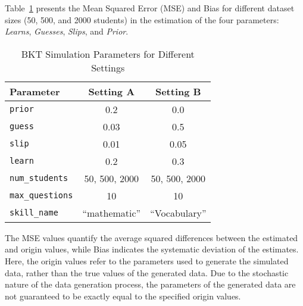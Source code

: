 \documentclass{article}
\begin{document}
Table~\ref{tab:sim_params_3} presents the Mean Squared Error (MSE) and Bias for different dataset sizes (50, 500, and 2000 students) in the estimation of the four parameters: \textit{Learns}, \textit{Guesses}, \textit{Slips}, and \textit{Prior}.

\begin{table}[H]
\centering
\caption{BKT Simulation Parameters for Different Settings}
\label{tab:sim_params_3}
\begin{tabular}{@{}lcc@{}}
\toprule
\textbf{Parameter} & \textbf{Setting A} & \textbf{Setting B} \\ 
\midrule
\texttt{prior} & 0.2 & 0.0 \\ 
\texttt{guess} & 0.03 & 0.5 \\ 
\texttt{slip} & 0.01 & 0.05 \\ 
\texttt{learn} & 0.2 & 0.3 \\ 
\texttt{num\_students} & 50, 500, 2000 & 50, 500, 2000 \\ 
\texttt{max\_questions} & 10 & 10 \\ 
\texttt{skill\_name} & ``mathematic'' & ``Vocabulary'' \\ 
\bottomrule
\end{tabular}
\end{table}
    
The MSE values quantify the average squared differences between the estimated and origin values, while Bias indicates the systematic deviation of the estimates. Here, the origin values refer to the parameters used to generate the simulated data, rather than the true values of the generated data. Due to the stochastic nature of the data generation process, the parameters of the generated data are not guaranteed to be exactly equal to the specified origin values.
\end{document}
